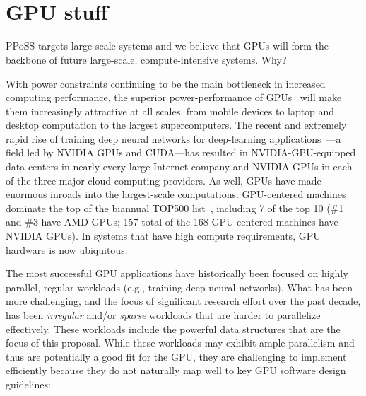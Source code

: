 \\
\\


\section{GPU stuff}

PPoSS targets large-scale systems and we believe that GPUs will form the backbone of future large-scale, compute-intensive systems. Why?

With power constraints continuing to be the main bottleneck in increased computing performance, the superior power-performance of GPUs~\cite{Dally:2010:GCT} will make them increasingly attractive at all scales, from mobile devices to laptop and desktop computation to the largest supercomputers. The recent and extremely rapid rise of training deep neural networks for deep-learning applications~\cite{Amodei:2015:DS2,Chetlur:2014:CEP,Coates:2013:DLW,Hannun:2014:DSU}---a field led by NVIDIA GPUs and CUDA---has resulted in NVIDIA-GPU-equipped data centers in nearly every large Internet company and NVIDIA GPUs in each of the three major cloud computing providers. As well, GPUs have made enormous inroads into the largest-scale computations. GPU-centered machines dominate the top of the biannual TOP500 list~\cite{top500:nov2022}, including 7 of the top 10 (\#1 and \#3 have AMD GPUs; 157 total of the 168 GPU-centered machines have NVIDIA GPUs). In systems that have high compute requirements, GPU hardware is now ubiquitous.

The most successful GPU applications have historically been focused on highly parallel, regular workloads (e.g., training deep neural networks). What has been more challenging, and the focus of significant research effort over the past decade, has been \emph{irregular} and/or \emph{sparse} workloads that are harder to parallelize effectively. These workloads include the powerful data structures that are the focus of this proposal. While these workloads may exhibit ample parallelism and thus are potentially a good fit for the GPU, they are challenging to implement efficiently because they do not naturally map well to key GPU software design guidelines:


